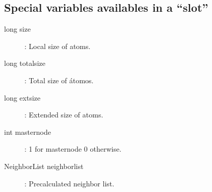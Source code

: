 \documentclass[a4paper,12pt]{article}
\begin{document}
\subsection{Special variables availables in a ``slot''}

\begin{description}
\item[long size]{: Local size of atoms.}
\item[long totalsize]{: Total size of \'atomos.}
\item[long extsize]{: Extended size of atoms.}
\item[int masternode]{: 1 for masternode 0 otherwise.}
\item[NeighborList neighborlist]{: Precalculated neighbor list.}
\end{description}
\end{document}
